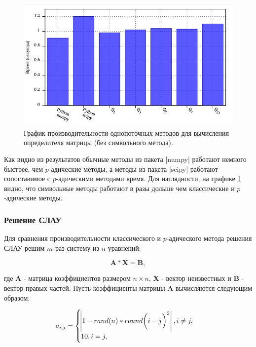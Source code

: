 \documentclass[master, och, diploma, times]{sty/SCWorks}
\theoremstyle{plain}
\theoremstyle{definition}
\numberwithin{equation}{section}
\begin{document}
\begin{figure}[H]
\centerline{\includegraphics[width=0.85\linewidth]{../gnuplot/single/det/wosymb.png}}
\caption{График производительности однопоточных методов для вычисления определителя матрицы (без символьного метода).}
\label{img:single:det:2}
\end{figure}

Как видно из результатов обычные методы из пакета |numpy| работают немного быстрее, чем $p$-адические методы, а методы из пакета |scipy| работают сопоставимое с $p$-адическими методами время. Для наглядности, на графике \ref{img:single:det:2} видно, что символьные методы работают в разы дольше чем классические и $p$-адические методы.

\subsubsection{Решение СЛАУ}
Для сравнения производительности классического и $p$-адического метода решения СЛАУ решим $m$ раз систему из $n$ уравнений:

\begin{equation}
\boldsymbol{A}*\boldsymbol{X}=\boldsymbol{B},
\end{equation}

\noindent где $\boldsymbol{A}$ - матрица коэффициентов размером $n \times n$, $\boldsymbol{X}$ - вектор неизвестных и $\boldsymbol{B}$ - вектор правых частей.
Пусть коэффициенты матрицы $\boldsymbol{A}$ вычисляются следующим образом:

\begin{equation}
a_{i,j}= 
\begin{cases} 
\abs{1-rand(n)*round\bigg(i-j\bigg)^2}, i \neq j, \\ 
10, i = j,
\end{cases}
\end{equation}
\end{document}
